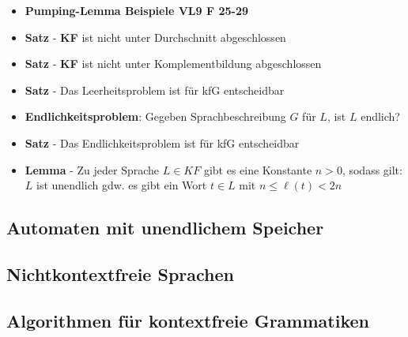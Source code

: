 \documentclass[12pt, a4paper]{article}
\begin{document}
\begin{itemize}
		\item \textbf{Pumping-Lemma Beispiele VL9 F 25-29}
		
		\item \textbf{Satz} - \textbf{KF} ist nicht unter Durchschnitt abgeschlossen
		
		\item \textbf{Satz} - \textbf{KF} ist nicht unter Komplementbildung abgeschlossen
		
		\item \textbf{Satz} - Das Leerheitsproblem ist für kfG entscheidbar
		
		\item \textbf{Endlichkeitsproblem}: Gegeben Sprachbeschreibung $G$ für $L$, ist $L$ endlich?
		
		\item \textbf{Satz} - Das Endlichkeitsproblem ist für kfG entscheidbar
		
		\item \textbf{Lemma} - Zu jeder Sprache $L\in KF$ gibt es eine Konstante $n>0$, sodass gilt: $L$ ist unendlich gdw. es gibt ein Wort $t\in L$ mit $n\leq\ell(t)<2n$
		
	\end{itemize}
	
	
	\subsection{Automaten mit unendlichem Speicher}
	
	\subsection{Nichtkontextfreie Sprachen}
	\subsection{Algorithmen für kontextfreie Grammatiken}
	
\end{document}
